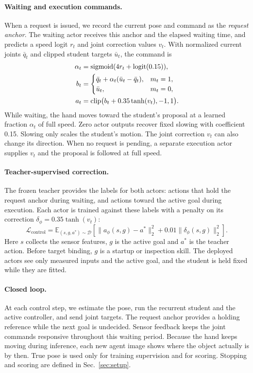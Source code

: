 \paragraph{Waiting and execution commands.}
When a request is issued, we record the current pose and command as the \emph{request anchor}. The waiting actor receives this anchor and the elapsed waiting time, and predicts a speed logit $r_t$ and joint correction values $v_t$. With normalized current joints $\bar q_t$ and clipped student targets $\bar u_t$, the command is
\begin{align}
 \alpha_t&=\operatorname{sigmoid}(4r_t+\operatorname{logit}(0.15)),\\
 b_t&=\begin{cases}
 \bar q_t+\alpha_t(\bar u_t-\bar q_t),&m_t=1,\\
 \bar u_t,&m_t=0,
 \end{cases}\\
 a_t&=\operatorname{clip}\bigl(b_t+0.35\tanh(v_t),-1,1\bigr).
\label{eq:control}
\end{align}
While waiting, the hand moves toward the student's proposal at a learned fraction $\alpha_t$ of full speed. Zero actor outputs recover fixed slowing with coefficient 0.15. Slowing only scales the student's motion. The joint correction $v_t$ can also change its direction. When no request is pending, a separate execution actor supplies $v_t$ and the proposal is followed at full speed.

\paragraph{Teacher-supervised correction.}
The frozen teacher provides the labels for both actors: actions that hold the request anchor during waiting, and actions toward the active goal during execution. Each actor is trained against these labels with a penalty on its correction $\delta_\phi=0.35\tanh(v_t)$:
\begin{equation}
 \mathcal{L}_{\mathrm{control}}=\mathbb{E}_{(s,g,a^*)\sim\mathcal{D}}\left[\|a_\phi(s,g)-a^*\|_2^2+0.01\|\delta_\phi(s,g)\|_2^2\right].
\label{eq:control_loss}
\end{equation}
Here $s$ collects the sensor features, $g$ is the active goal and $a^*$ is the teacher action. Before target binding, $g$ is a startup or inspection skill. The deployed actors see only measured inputs and the active goal, and the student is held fixed while they are fitted.

\paragraph{Closed loop.}
At each control step, we estimate the pose, run the recurrent student and the active controller, and send joint targets. The request anchor provides a holding reference while the next goal is undecided. Sensor feedback keeps the joint commands responsive throughout this waiting period. Because the hand keeps moving during inference, each new agent image shows where the object actually is by then. True pose is used only for training supervision and for scoring. Stopping and scoring are defined in Sec.~\ref{sec:setup}.
